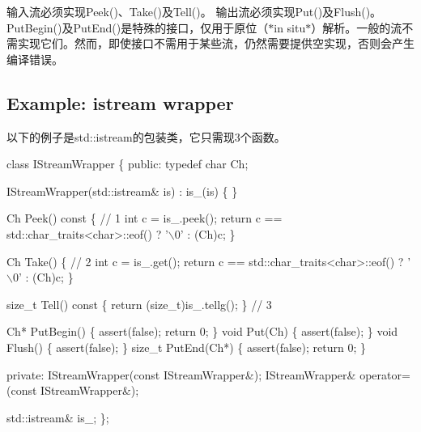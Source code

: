输入流必须实现{\ttfamily Peek()}、{\ttfamily Take()}及{\ttfamily Tell()}。 输出流必须实现{\ttfamily Put()}及{\ttfamily Flush()}。 {\ttfamily Put\+Begin()}及{\ttfamily Put\+End()}是特殊的接口，仅用于原位（$\ast$in situ$\ast$）解析。一般的流不需实现它们。然而，即使接口不需用于某些流，仍然需要提供空实现，否则会产生编译错误。\hypertarget{md_Cadriciel_Commun_Externe_RapidJSON_doc_stream.zh-cn_ExampleIStreamWrapper}{}\subsection{Example\+: istream wrapper}\label{md_Cadriciel_Commun_Externe_RapidJSON_doc_stream.zh-cn_ExampleIStreamWrapper}
以下的例子是{\ttfamily std\+::istream}的包装类，它只需现3个函数。


\begin{DoxyCode}
\textcolor{keyword}{class }IStreamWrapper \{
\textcolor{keyword}{public}:
    \textcolor{keyword}{typedef} \textcolor{keywordtype}{char} Ch;

    IStreamWrapper(std::istream& is) : is\_(is) \{
    \}

    Ch Peek()\textcolor{keyword}{ const }\{ \textcolor{comment}{// 1}
        \textcolor{keywordtype}{int} c = is\_.peek();
        \textcolor{keywordflow}{return} c == std::char\_traits<char>::eof() ? \textcolor{charliteral}{'\(\backslash\)0'} : (Ch)c;
    \}

    Ch Take() \{ \textcolor{comment}{// 2}
        \textcolor{keywordtype}{int} c = is\_.get();
        \textcolor{keywordflow}{return} c == std::char\_traits<char>::eof() ? \textcolor{charliteral}{'\(\backslash\)0'} : (Ch)c;
    \}

    \textcolor{keywordtype}{size\_t} Tell()\textcolor{keyword}{ const }\{ \textcolor{keywordflow}{return} (\textcolor{keywordtype}{size\_t})is\_.tellg(); \} \textcolor{comment}{// 3}

    Ch* PutBegin() \{ assert(\textcolor{keyword}{false}); \textcolor{keywordflow}{return} 0; \}
    \textcolor{keywordtype}{void} Put(Ch) \{ assert(\textcolor{keyword}{false}); \}
    \textcolor{keywordtype}{void} Flush() \{ assert(\textcolor{keyword}{false}); \}
    \textcolor{keywordtype}{size\_t} PutEnd(Ch*) \{ assert(\textcolor{keyword}{false}); \textcolor{keywordflow}{return} 0; \}

\textcolor{keyword}{private}:
    IStreamWrapper(\textcolor{keyword}{const} IStreamWrapper&);
    IStreamWrapper& operator=(\textcolor{keyword}{const} IStreamWrapper&);

    std::istream& is\_;
\};
\end{DoxyCode}


